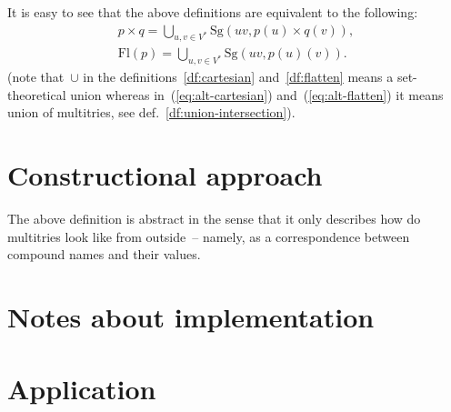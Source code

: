 \documentclass{article}
\theoremstyle{definition}
\newcommand{\flatten}{\mathrm{Fl}}
\newcommand{\singleleaf}{\mathrm{Sg}}
\begin{document}
It is easy to see that the above definitions are equivalent to the following:
\begin{eqnarray}
  \label{eq:alt-cartesian}
  p\times q =
    \bigcup_{u,v\in V^\ast} \singleleaf(uv, p(u) \times q(v)) ,\\
  \label{eq:alt-flatten}
  \flatten(p) =
    \bigcup_{u,v\in V^\ast} \singleleaf(uv, p(u)(v)) .
\end{eqnarray}
(note that~$\cup$ in the definitions~\ref{df:cartesian} and~\ref{df:flatten}
means a set-theoretical union whereas in~(\ref{eq:alt-cartesian})
and~(\ref{eq:alt-flatten}) it means union of multitries, see
def.~\ref{df:union-intersection}).

\section{Constructional approach}

The above definition is abstract in the sense that it only describes how do
multitries look like from outside~-- namely, as a correspondence between
compound names and their values.

\section{Notes about implementation}

\section{Application}
\end{document}
